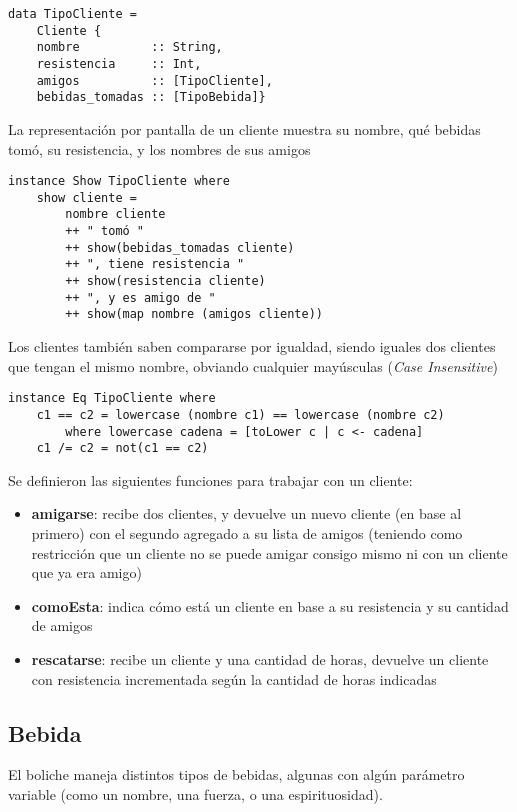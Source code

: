 \begin{lstlisting}
data TipoCliente = 
    Cliente {
    nombre          :: String,
    resistencia     :: Int,
    amigos          :: [TipoCliente],
    bebidas_tomadas :: [TipoBebida]}
\end{lstlisting}

La representación por pantalla de un cliente muestra su nombre, qué bebidas tomó, su resistencia, y los nombres de sus amigos
\clearpage
\begin{lstlisting}
instance Show TipoCliente where
    show cliente = 
        nombre cliente
        ++ " tomó "
        ++ show(bebidas_tomadas cliente)
        ++ ", tiene resistencia "
        ++ show(resistencia cliente)
        ++ ", y es amigo de "
        ++ show(map nombre (amigos cliente))
\end{lstlisting}

Los clientes también saben compararse por igualdad, siendo iguales dos clientes que tengan el mismo nombre, obviando cualquier mayúsculas (\emph{Case Insensitive})

\begin{lstlisting}
instance Eq TipoCliente where
    c1 == c2 = lowercase (nombre c1) == lowercase (nombre c2)
        where lowercase cadena = [toLower c | c <- cadena]
    c1 /= c2 = not(c1 == c2)
\end{lstlisting}

Se definieron las siguientes funciones para trabajar con un cliente:
\begin{itemize}
    \item \textbf{amigarse}: recibe dos clientes, y devuelve un nuevo cliente (en base al primero) con el segundo agregado a su lista de amigos (teniendo como restricción que un cliente no se puede amigar consigo mismo ni con un cliente que ya era amigo)
    \item \textbf{comoEsta}: indica cómo está un cliente en base a su resistencia y su cantidad de amigos 
    \item \textbf{rescatarse}: recibe un cliente y una cantidad de horas, devuelve un cliente con resistencia incrementada según la cantidad de horas indicadas 

\end{itemize}
\subsection{Bebida}

El boliche maneja distintos tipos de bebidas, algunas con algún parámetro variable (como un nombre, una fuerza, o una espirituosidad).

